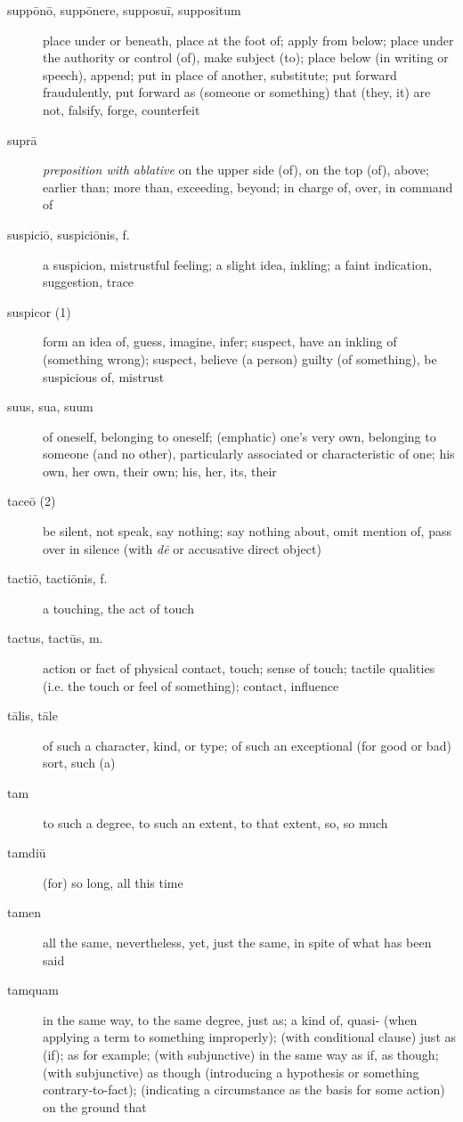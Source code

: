 \begin{description}
    \item[suppōnō, suppōnere, supposuī, suppositum] place under or beneath, place at the foot of; apply from below; place under the authority or control (of), make subject (to); place below (in writing or speech), append; put in place of another, substitute; put forward fraudulently, put forward as (someone or something) that (they, it) are not, falsify, forge, counterfeit
    \item[suprā] \marginnote{*}\textit{preposition with ablative} on the upper side (of), on the top (of), above; earlier than; more than, exceeding, beyond; in charge of, over, in command of
    \item[suspiciō, suspiciōnis, f.] a suspicion, mistrustful feeling; a slight idea, inkling; a faint indication, suggestion, trace
    \item[suspicor (1)] form an idea of, guess, imagine, infer; suspect, have an inkling of (something wrong); suspect, believe (a person) guilty (of something), be suspicious of, mistrust
    \item[suus, sua, suum] \marginnote{*}of oneself, belonging to oneself; (emphatic) one's very own, belonging to someone (and no other), particularly associated or characteristic of one; his own, her own, their own; his, her, its, their
    \item[taceō (2)] \marginnote{*}be silent, not speak, say nothing; say nothing about, omit mention of, pass over in silence (with \textit{dē} or accusative direct object)
    \item[tactiō, tactiōnis, f.] a touching, the act of touch
    \item[tactus, tactūs, m.] action or fact of physical contact, touch; sense of touch; tactile qualities (i.e. the touch or feel of something); contact, influence
    \item[tālis, tāle] \marginnote{*}of such a character, kind, or type; of such an exceptional (for good or bad) sort, such (a)
    \item[tam] \marginnote{*}to such a degree, to such an extent, to that extent, so, so much
    \item[tamdiū] (for) so long, all this time
    \item[tamen] \marginnote{*}all the same, nevertheless, yet, just the same, in spite of what has been said
    \item[tamquam] \marginnote{*}in the same way, to the same degree, just as; a kind of, quasi- (when applying a term to something improperly); (with conditional clause) just as (if); as for example; (with subjunctive) in the same way as if, as though; (with subjunctive) as though (introducing a hypothesis or something contrary-to-fact); (indicating a circumstance as the basis for some action) on the ground that

\end{description}
